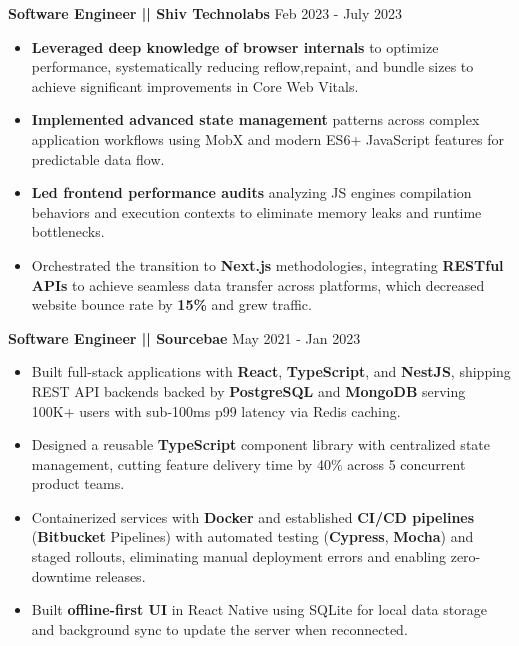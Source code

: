 \documentclass[100pt,a4paper]{article}
\begin{document}
\vspace{5pt}
\textbf{Software Engineer || Shiv Technolabs}
\hfill Feb 2023 - July 2023
\begin{itemize}
\vspace{2pt}
\item {\textbf{Leveraged deep knowledge of browser internals} to optimize performance, systematically reducing reflow,repaint, and bundle sizes to achieve significant improvements in Core Web Vitals.}
\item {\textbf{Implemented advanced state management} patterns across complex application workflows using MobX and modern ES6+ JavaScript features for predictable data flow.}
\item {\textbf{Led frontend performance audits} analyzing JS engines compilation behaviors and execution contexts to eliminate memory leaks and runtime bottlenecks.}
\item {Orchestrated the transition to \textbf{Next.js} methodologies, integrating \textbf{RESTful APIs} to achieve seamless data transfer across platforms, which decreased website bounce rate by \textbf{15\%} and grew traffic.}
\end{itemize}




\vspace{5pt}
\textbf{Software Engineer || Sourcebae}
\hfill May 2021 - Jan 2023
\begin{itemize}
\vspace{2pt}
\item {Built full-stack applications with \textbf{React}, \textbf{TypeScript}, and \textbf{NestJS}, shipping REST API backends backed by \textbf{PostgreSQL} and \textbf{MongoDB} serving 100K+ users with sub-100ms p99 latency via Redis caching.}
\item {Designed a reusable \textbf{TypeScript} component library with centralized state management, cutting feature delivery time by 40\% across 5 concurrent product teams.}
\item {Containerized services with \textbf{Docker} and established \textbf{CI/CD pipelines} (\textbf{Bitbucket} Pipelines) with automated testing (\textbf{Cypress}, \textbf{Mocha}) and staged rollouts, eliminating manual deployment errors and enabling zero-downtime releases.}
\item {Built \textbf{offline-first UI} in React Native using SQLite for local data storage and background sync to update the server when reconnected.}

\end{itemize}
\end{document}
